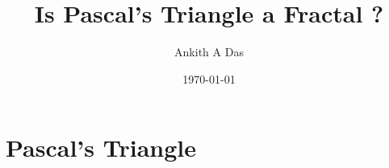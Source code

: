 \documentclass{beamer}
\title{Is Pascal's Triangle a Fractal ?}
\author{Ankith A Das}
\institute{The University of Sydney}
\date{\today}
\begin{document}
\frame{\titlepage}


\section[Outline]{}

\section{Pascal's Triangle}
\end{document}
